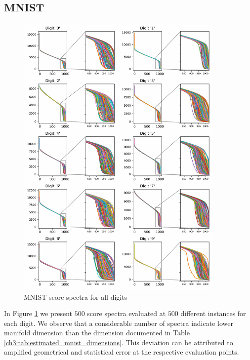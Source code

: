    \subsection{MNIST}
   \label{ch3:sec:Additional_Experimental_Results_for_MNIST}
   \begin{figure}[h!]
       \centering
       \includegraphics[width=0.9\textwidth]{chapter3/figures/image_manifolds/MNIST/mnist_spectrum_all_curves.jpg}
       \caption{MNIST score spectra for all digits}
       \label{ch3:fig:score_spectra_mnist_extended}
   \end{figure}
   
   In Figure \ref{ch3:fig:score_spectra_mnist_extended} we present $500$ score spectra evaluated at $500$ different instances for each digit. We observe that a considerable number of spectra indicate lower manifold dimension than the dimension documented in Table \ref{ch3:tab:estimated_mnist_dimensions}. This deviation can be attributed to amplified
   geometrical and statistical error at the respective evaluation points. 
   
